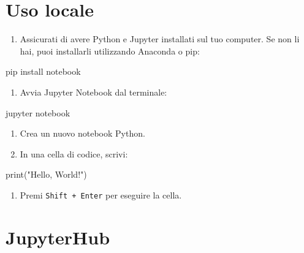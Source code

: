 \documentclass[
  letterpaper,
]{scrbook}
\newenvironment{Shaded}{\begin{snugshade}}{\end{snugshade}}
\newcommand{\BuiltInTok}[1]{\textcolor[rgb]{0.00,0.23,0.31}{#1}}
\newcommand{\ExtensionTok}[1]{\textcolor[rgb]{0.00,0.23,0.31}{#1}}
\newcommand{\NormalTok}[1]{\textcolor[rgb]{0.00,0.23,0.31}{#1}}
\newcommand{\StringTok}[1]{\textcolor[rgb]{0.13,0.47,0.30}{#1}}
\providecommand{\tightlist}{%
  \setlength{\itemsep}{0pt}\setlength{\parskip}{0pt}}\usepackage{longtable,booktabs,array}
\begin{document}
\section{Uso locale}

\begin{enumerate}
\def\labelenumi{\arabic{enumi}.}
\tightlist
\item
  Assicurati di avere Python e Jupyter installati sul tuo computer. Se
  non li hai, puoi installarli utilizzando Anaconda o pip:
\end{enumerate}

\begin{Shaded}
\begin{Highlighting}[]
\ExtensionTok{pip}\NormalTok{ install notebook}
\end{Highlighting}
\end{Shaded}

\begin{enumerate}
\def\labelenumi{\arabic{enumi}.}
\setcounter{enumi}{1}
\tightlist
\item
  Avvia Jupyter Notebook dal terminale:
\end{enumerate}

\begin{Shaded}
\begin{Highlighting}[]
\ExtensionTok{jupyter}\NormalTok{ notebook}
\end{Highlighting}
\end{Shaded}

\begin{enumerate}
\def\labelenumi{\arabic{enumi}.}
\setcounter{enumi}{2}
\tightlist
\item
  Crea un nuovo notebook Python.
\item
  In una cella di codice, scrivi:
\end{enumerate}

\begin{Shaded}
\begin{Highlighting}[]
\BuiltInTok{print}\NormalTok{(}\StringTok{"Hello, World!"}\NormalTok{)}
\end{Highlighting}
\end{Shaded}

\begin{enumerate}
\def\labelenumi{\arabic{enumi}.}
\setcounter{enumi}{4}
\tightlist
\item
  Premi \texttt{Shift\ +\ Enter} per eseguire la cella.
\end{enumerate}

\section{JupyterHub}
\end{document}
